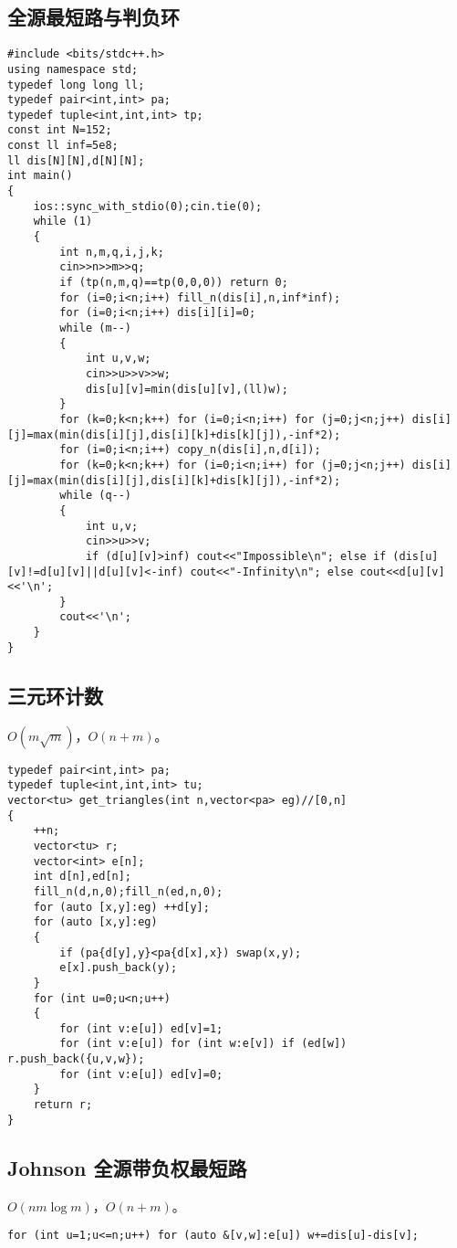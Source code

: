 \documentclass{ctexart}
\begin{document}
\subsection{全源最短路与判负环}

\begin{lstlisting}
#include <bits/stdc++.h>
using namespace std;
typedef long long ll;
typedef pair<int,int> pa;
typedef tuple<int,int,int> tp;
const int N=152;
const ll inf=5e8;
ll dis[N][N],d[N][N];
int main()
{
	ios::sync_with_stdio(0);cin.tie(0);
	while (1)
	{
		int n,m,q,i,j,k;
		cin>>n>>m>>q;
		if (tp(n,m,q)==tp(0,0,0)) return 0;
		for (i=0;i<n;i++) fill_n(dis[i],n,inf*inf);
		for (i=0;i<n;i++) dis[i][i]=0;
		while (m--)
		{
			int u,v,w;
			cin>>u>>v>>w;
			dis[u][v]=min(dis[u][v],(ll)w);
		}
		for (k=0;k<n;k++) for (i=0;i<n;i++) for (j=0;j<n;j++) dis[i][j]=max(min(dis[i][j],dis[i][k]+dis[k][j]),-inf*2);
		for (i=0;i<n;i++) copy_n(dis[i],n,d[i]);
		for (k=0;k<n;k++) for (i=0;i<n;i++) for (j=0;j<n;j++) dis[i][j]=max(min(dis[i][j],dis[i][k]+dis[k][j]),-inf*2);
		while (q--)
		{
			int u,v;
			cin>>u>>v;
			if (d[u][v]>inf) cout<<"Impossible\n"; else if (dis[u][v]!=d[u][v]||d[u][v]<-inf) cout<<"-Infinity\n"; else cout<<d[u][v]<<'\n';
		}
		cout<<'\n';
	}
}
\end{lstlisting}

\subsection{三元环计数}

$O(m\sqrt m)$，$O(n+m)$。

\begin{lstlisting}
typedef pair<int,int> pa;
typedef tuple<int,int,int> tu;
vector<tu> get_triangles(int n,vector<pa> eg)//[0,n]
{
	++n;
	vector<tu> r;
	vector<int> e[n];
	int d[n],ed[n];
	fill_n(d,n,0);fill_n(ed,n,0);
	for (auto [x,y]:eg) ++d[y];
	for (auto [x,y]:eg)
	{
		if (pa{d[y],y}<pa{d[x],x}) swap(x,y);
		e[x].push_back(y);
	}
	for (int u=0;u<n;u++)
	{
		for (int v:e[u]) ed[v]=1;
		for (int v:e[u]) for (int w:e[v]) if (ed[w]) r.push_back({u,v,w});
		for (int v:e[u]) ed[v]=0;
	}
	return r;
}
\end{lstlisting}

\subsection{Johnson 全源带负权最短路}

$O(nm\log m)$，$O(n+m)$。

\begin{lstlisting}
for (int u=1;u<=n;u++) for (auto &[v,w]:e[u]) w+=dis[u]-dis[v];
\end{lstlisting}
\end{document}
